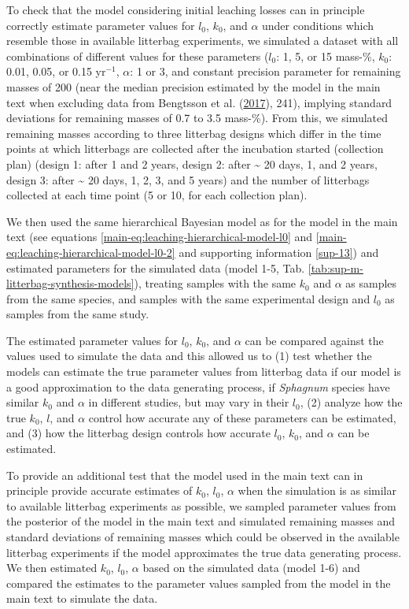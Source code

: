 \documentclass[
  12pt,
]{article}
\begin{document}
To check that the model considering initial leaching losses can in principle correctly estimate parameter values for \(l_0\), \(k_0\), and \(\alpha\) under conditions which resemble those in available litterbag experiments, we simulated a dataset with all combinations of different values for these parameters (\(l_0\): 1, 5, or 15 mass-\%, \(k_0\): 0.01, 0.05, or 0.15 yr\(^{-1}\), \(\alpha\): 1 or 3, and constant precision parameter for remaining masses of 200 (near the median precision estimated by the model in the main text when excluding data from Bengtsson et al. (\protect\hyperlink{ref-Bengtsson.2017}{2017}), 241), implying standard deviations for remaining masses of 0.7 to 3.5 mass-\%). From this, we simulated remaining masses according to three litterbag designs which differ in the time points at which litterbags are collected after the incubation started (collection plan) (design 1: after 1 and 2 years, design 2: after \textasciitilde{} 20 days, 1, and 2 years, design 3: after \textasciitilde{} 20 days, 1, 2, 3, and 5 years) and the number of litterbags collected at each time point (5 or 10, for each collection plan).

We then used the same hierarchical Bayesian model as for the model in the main text (see equations \ref{main-eq:leaching-hierarchical-model-l0} and \ref{main-eq:leaching-hierarchical-model-l0-2} and supporting information \ref{sup-13}) and estimated parameters for the simulated data (model 1-5, Tab. \ref{tab:sup-m-litterbag-synthesis-models}), treating samples with the same \(k_0\) and \(\alpha\) as samples from the same species, and samples with the same experimental design and \(l_0\) as samples from the same study.

The estimated parameter values for \(l_0\), \(k_0\), and \(\alpha\) can be compared against the values used to simulate the data and this allowed us to (1) test whether the models can estimate the true parameter values from litterbag data if our model is a good approximation to the data generating process, if \emph{Sphagnum} species have similar \(k_0\) and \(\alpha\) in different studies, but may vary in their \(l_0\), (2) analyze how the true \(k_0\), \(l\), and \(\alpha\) control how accurate any of these parameters can be estimated, and (3) how the litterbag design controls how accurate \(l_0\), \(k_0\), and \(\alpha\) can be estimated.

To provide an additional test that the model used in the main text can in principle provide accurate estimates of \(k_0\), \(l_0\), \(\alpha\) when the simulation is as similar to available litterbag experiments as possible, we sampled parameter values from the posterior of the model in the main text and simulated remaining masses and standard deviations of remaining masses which could be observed in the available litterbag experiments if the model approximates the true data generating process. We then estimated \(k_0\), \(l_0\), \(\alpha\) based on the simulated data (model 1-6) and compared the estimates to the parameter values sampled from the model in the main text to simulate the data.
\end{document}

